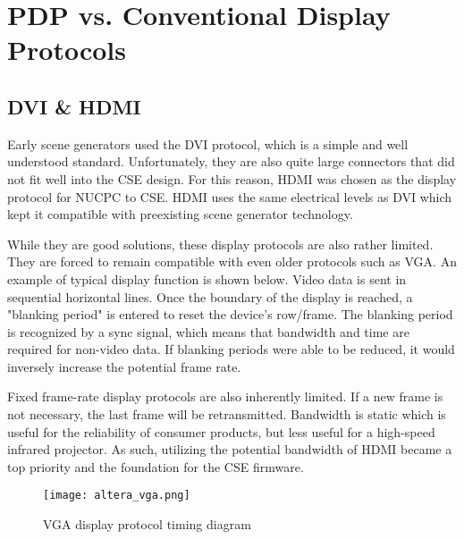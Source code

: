 %
%
\chapter{PDP vs. Conventional Display Protocols}
\section{DVI \& HDMI}
Early scene generators used the DVI protocol, which is a simple and well understood standard. Unfortunately, they are also quite large connectors that did not fit well into the CSE design. For this reason, HDMI was chosen as the display protocol for NUCPC to CSE. HDMI uses the same electrical levels as DVI which kept it compatible with preexisting scene generator technology. \par
While they are good solutions, these display protocols are also rather limited. They are forced to remain compatible with even older protocols such as VGA. An example of typical display function is shown below. Video data is sent in sequential horizontal lines. Once the boundary of the display is reached, a "blanking period" is entered to reset the device's row/frame. The blanking period is recognized by a sync signal, which means that bandwidth and time are required for non-video data. If blanking periods were able to be reduced, it would inversely increase the potential frame rate. \par
Fixed frame-rate display protocols are also inherently limited. If a new frame is not necessary, the last frame will be retransmitted. Bandwidth is static which is useful for the reliability of consumer products, but less useful for a high-speed infrared projector. As such, utilizing the potential bandwidth of HDMI became a top priority and the foundation for the CSE firmware.
\begin{figure}[!htb]
	\texttt{[image: altera\_vga.png]}
	\centering
	\caption{VGA display protocol timing diagram \cite{alteravga}}
	\centering
\end{figure}
